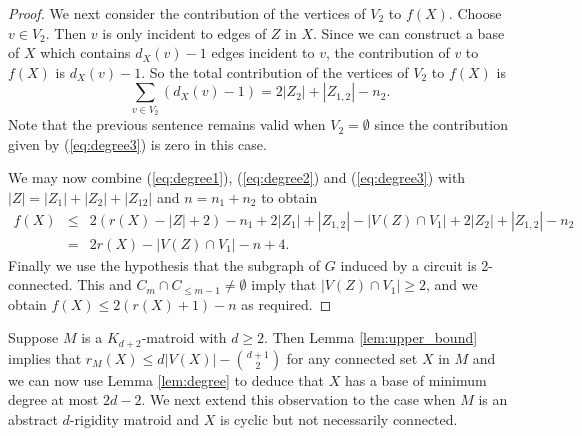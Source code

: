 \documentclass{daj}
\begin{document}
\begin{proof}
We next consider the contribution of the vertices of $V_2$ to $f(X)$. Choose $v\in V_2$. Then $v$ is only incident to edges of $Z$ in $X$. Since we can construct a base of $X$ which contains $d_X(v)-1$ edges incident to $v$, the contribution of $v$ to $f(X)$ is $d_X(v)-1$. So the total contribution of the vertices of $V_2$ to $f(X)$ is
\begin{equation}\label{eq:degree3}
 \sum_{v\in V_2}(d_X(v)-1)=2|Z_2|+|Z_{1,2}|-n_2.
\end{equation}
Note that the previous sentence remains valid when $V_2=\emptyset$ since the contribution given by (\ref{eq:degree3}) is zero in this case.

 We may now combine   (\ref{eq:degree1}), (\ref{eq:degree2}) and (\ref{eq:degree3}) with $|Z|=|Z_1|+|Z_2|+|Z_{12}|$ and $n=n_1+n_2$ to obtain
\begin{eqnarray*}
f(X)&\leq& 2(r(X)-|Z|+2)-n_1
+2|Z_1|+|Z_{1,2}|-|V(Z)\cap V_1|+
2|Z_2|+|Z_{1,2}|-n_2\\
&=&2r(X)-|V(Z)\cap V_1|-n+4. 
\end{eqnarray*}
Finally we use the hypothesis that the subgraph of $G$ induced by a circuit %
is 2-connected. 
This  and $C_m\cap C_{\leq m-1}\neq \emptyset$ imply that
$|V(Z)\cap V_1|\geq 2$,
and we obtain $f(X)\leq  2(r(X)+1)-n$ as required.
\end{proof}


Suppose $M$ is a $K_{d+2}$-matroid with $d\geq 2$. Then Lemma \ref{lem:upper_bound} implies that $r_M(X)\leq d|V(X)|-{{d+1}\choose{2}}$ for any connected set $X$ in $M$ and we can now use  Lemma \ref{lem:degree} to deduce that $X$ has a base of minimum degree at most $2d-2$. We next extend this observation to the case when $M$ is an abstract $d$-rigidity matroid and $X$ is cyclic but not necessarily connected.
\end{document}
